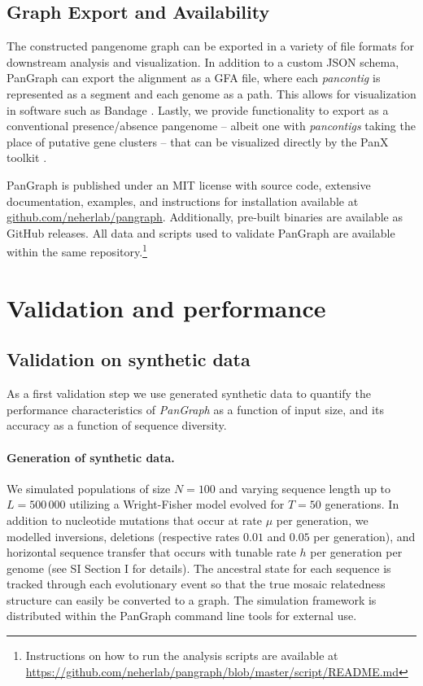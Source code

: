 \documentclass[aps,rmp,reprint,superscriptaddress,notitlepage,10pt]{revtex4-1}
\begin{document}
\subsection{Graph Export and Availability}
The constructed pangenome graph can be exported in a variety of file formats for downstream analysis and visualization.
In addition to a custom JSON schema, PanGraph can export the alignment as a GFA file, where each \emph{pancontig} is represented as a segment and each genome as a path.
This allows for visualization in software such as Bandage \cite{wick2015bandage}.
Lastly, we provide functionality to export as a conventional presence/absence pangenome {--} albeit one with \emph{pancontigs} taking the place of putative gene clusters {--} that can be visualized directly by the PanX toolkit \cite{ding2018panx}.

PanGraph is published under an MIT license with source code, extensive documentation, examples, and instructions for installation available at \url{github.com/neherlab/pangraph}.
Additionally, pre-built binaries are available as GitHub releases.
All data and scripts used to validate PanGraph are available within the same repository.\footnote{Instructions on how to run the analysis scripts are available at \url{https://github.com/neherlab/pangraph/blob/master/script/README.md}}

\section{Validation and performance}

\subsection{Validation on synthetic data}

As a first validation step we use generated synthetic data to quantify the performance characteristics of \textit{PanGraph} as a function of input size, and its accuracy as a function of sequence diversity.

\paragraph*{Generation of synthetic data.}

We simulated populations of size $N=100$ and varying sequence length up to $L=500\,000$ utilizing a Wright-Fisher model \cite{hudson2002generating} evolved for $T=50$ generations.
In addition to nucleotide mutations that occur at rate $\mu$ per generation, we modelled inversions, deletions (respective rates $0.01$ and $0.05$ per generation), and horizontal sequence transfer that occurs with tunable rate $h$ per generation per genome (see SI Section I for details).
The ancestral state for each sequence is tracked through each evolutionary event so that the true mosaic relatedness structure can easily be converted to a graph.
The simulation framework is distributed within the PanGraph command line tools for external use.
\end{document}
